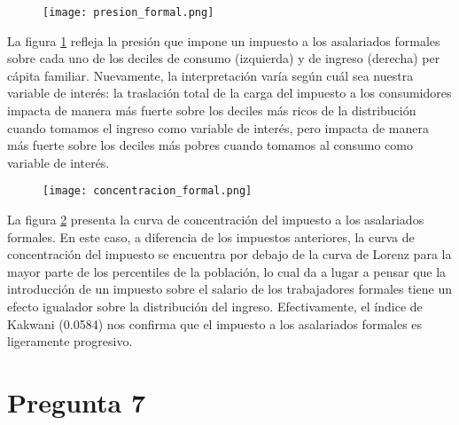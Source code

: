 \documentclass[11pt,oneside]{article}
\begin{document}
 	\begin{figure}
    		\centering
    		\texttt{[image: presion\_formal.png]}
    		\label{fig:6A}
	\end{figure}

	La figura \ref{fig:6A} refleja la presión que impone un impuesto a los asalariados formales sobre cada uno de los deciles de consumo (izquierda) y de ingreso (derecha) per cápita familiar. Nuevamente, la interpretación varía según cuál sea nuestra variable de interés: la traslación total de la carga del impuesto a los consumidores impacta de manera más fuerte sobre los deciles más ricos de la distribución cuando tomamos el ingreso como variable de interés, pero impacta de manera más fuerte sobre los deciles más pobres cuando tomamos al consumo como variable de interés.

	\begin{figure}
    		\centering
    		\texttt{[image: concentracion\_formal.png]}
    		\label{fig:6B}
	\end{figure}

	La figura \ref{fig:6B} presenta la curva de concentración del impuesto a los asalariados formales. En este caso, a diferencia de los impuestos anteriores, la curva de concentración del impuesto se encuentra por debajo de la curva de Lorenz para la mayor parte de los percentiles de la población, lo cual da a lugar a pensar que la introducción de un impuesto sobre el salario de los trabajadores formales tiene un efecto igualador sobre la distribución del ingreso. Efectivamente, el índice de Kakwani (0.0584) nos confirma que el impuesto a los asalariados formales es ligeramente progresivo.
	
	\section*{Pregunta 7}
	
	
	
	
	
	
	
\end{document}
